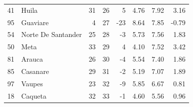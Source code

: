 \begin{tabular}{llrrrrrr}
41 & Huila & 31 & 26 & 5 & 4.76 & 7.92 & 3.16 \\
95 & Guaviare & 4 & 27 & -23 & 8.64 & 7.85 & -0.79 \\
54 & Norte De Santander & 25 & 28 & -3 & 5.73 & 7.56 & 1.83 \\
50 & Meta & 33 & 29 & 4 & 4.10 & 7.52 & 3.42 \\
81 & Arauca & 26 & 30 & -4 & 5.54 & 7.40 & 1.86 \\
85 & Casanare & 29 & 31 & -2 & 5.19 & 7.07 & 1.89 \\
97 & Vaupes & 23 & 32 & -9 & 5.85 & 6.67 & 0.81 \\
18 & Caqueta & 32 & 33 & -1 & 4.60 & 5.56 & 0.96 \\
\bottomrule
\end{tabular}
